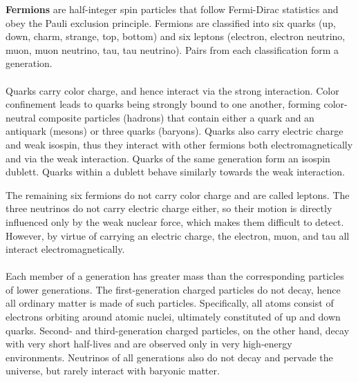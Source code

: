 \textbf{Fermions} are half-integer spin particles that follow Fermi-Dirac statistics and obey the Pauli exclusion principle. Fermions are classified into six quarks (up, down, charm, strange, top, bottom) and six leptons (electron, electron neutrino, muon, muon neutrino, tau, tau neutrino). Pairs from each classification form a generation.\\ \\
Quarks carry color charge, and hence interact via the strong interaction. Color confinement leads to quarks being strongly bound to one another, forming color-neutral composite particles (hadrons) that contain either a quark and an antiquark (mesons) or three quarks (baryons). Quarks also carry electric charge and weak isospin, thus they interact with other fermions both electromagnetically and via the weak interaction. Quarks of the same generation form an isospin dublett. Quarks within a dublett behave similarly towards the weak interaction.

The remaining six fermions do not carry color charge and are called leptons. The three neutrinos do not carry electric charge either, so their motion is directly influenced only by the weak nuclear force, which makes them difficult to detect. However, by virtue of carrying an electric charge, the electron, muon, and tau all interact electromagnetically.\\ \\
Each member of a generation has greater mass than the corresponding particles of lower generations. The first-generation charged particles do not decay, hence all ordinary matter is made of such particles. Specifically, all atoms consist of electrons orbiting around atomic nuclei, ultimately constituted of up and down quarks. Second- and third-generation charged particles, on the other hand, decay with very short half-lives and are observed only in very high-energy environments. Neutrinos of all generations also do not decay and pervade the universe, but rarely interact with baryonic matter.

